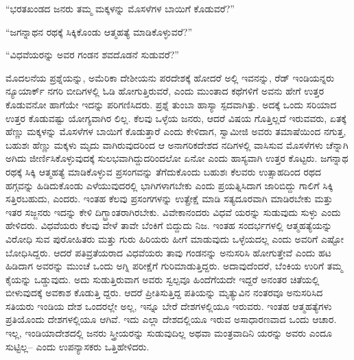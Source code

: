 \begin{myquote}
“ಭರತಖಂಡದ ಜನರು ತಮ್ಮ ಮಕ್ಕಳನ್ನು ಮೊಸಳೆಗಳ ಬಾಯಿಗೆ ಕೊಡುವರೆ?”
\end{myquote}

\begin{myquote}
“ಜಗನ್ನಾಥನ ರಥಕ್ಕೆ ಸಿಕ್ಕಿಕೊಂಡು ಆತ್ಮಹತ್ಯೆ ಮಾಡಿಕೊಳ್ಳುವರೆ?”
\end{myquote}

\begin{myquote}
“ವಿಧವೆಯರನ್ನು ಅವರ ಗಂಡನ ಶವದೊಡನೆ ಸುಡುವರೆ?”
\end{myquote}

ಮೊದಲನೆಯ ಪ್ರಶ್ನೆಯನ್ನು, ಅಮೆರಿಕಾ ದೇಶೀಯನು ಪರದೇಶಕ್ಕೆ ಹೋದರೆ ಅಲ್ಲಿ ಇವನನ್ನು, ರೆಡ್​ ಇಂಡಿಯನ್ನರು ನ್ಯೂಯಾರ್ಕ್​ ನಗರಿ ಬೀದಿಗಳಲ್ಲಿ ಓಡಿ ಹೋಗುತ್ತಿರುವರೆ, ಎಂದು ಮುಂತಾದ ಕಥೆಗಳಿಗೆ ಅವನು ಹೇಗೆ ಉತ್ತರ ಕೊಡುವನೋ ಹಾಗೆಯೇ ಇದನ್ನು ಪರಿಗಣಿಸಿದರು. ಪ್ರಶ್ನೆ ತುಂಬಾ ಹಾಸ್ಯಾ ಸ್ಪದವಾಗಿತ್ತು. ಅದಕ್ಕೆ ಒಂದು ಸರಿಯಾದ ಉತ್ತರ ಕೊಡುವಷ್ಟು ಯೋಗ್ಯವಾಗಿರ ಲಿಲ್ಲ. ಕೆಲವು ಒಳ್ಳೆಯ ಜನರು, ಆದರೆ ವಿಷಯ ಗೊತ್ತಿಲ್ಲದೆ ಇರುವವರು, ಏತಕ್ಕೆ ಹೆಣ್ಣು ಮಕ್ಕಳನ್ನು ಮೊಸಳೆಗಳ ಬಾಯಿಗೆ ಕೊಡುತ್ತಾರೆ ಎಂದು ಕೇಳಿದಾಗ, ಸ್ವಾಮೀಜಿ ಅವರು ತಮಾಷೆಯಿಂದ ನಗುತ್ತ, ಬಹುಶಃ ಹೆಣ್ಣು ಮಕ್ಕಳು ಮೃದು ವಾಗಿರುವುದರಿಂದ ಆ ಅನಾಗರಿಕದೇಶದ ನದಿಗಳಲ್ಲಿ ವಾಸಿಸುವ ಮೊಸಳೆಗಳು ಚೆನ್ನಾಗಿ ಅಗಿದು ಜೀರ್ಣಿಸಿಕೊಳ್ಳುವುದಕ್ಕೆ ಸುಲಭವಾಗಿದ್ದುದರಿಂದಲೋ ಏನೋ ಎಂದು ಹಾಸ್ಯವಾಗಿ ಉತ್ತರ ಕೊಟ್ಟರು. ಜಗನ್ನಾಥ ರಥಕ್ಕೆ ಸಿಕ್ಕಿ ಆತ್ಮಹತ್ಯೆ ಮಾಡಿಕೊಳ್ಳುವ ಪ್ರಸಂಗವನ್ನು ತೆಗೆದುಕೊಂದು ಬಹುಶಃ ಕೆಲವರು ಉತ್ಸಾಹದಿಂದ ರಥದ ಹಗ್ಗವನ್ನು ಹಿಡಿದುಕೊಂಡು ಎಳೆಯುವುದರಲ್ಲಿ ಭಾಗಿಗಳಾಗಬೇಕು ಎಂದು ಪ್ರಯತ್ನಿಸಿದಾಗ ಜಾರಿಬಿದ್ದು ಗಾಲಿಗೆ ಸಿಕ್ಕಿ ಸತ್ತಿರಬಹುದು, ಎಂದರು. ಇಂತಹ ಕೆಲವು ಪ್ರಸಂಗಗಳನ್ನು ಉತ್ಪ್ರೇಕ್ಷೆ ಮಾಡಿ ಸತ್ಯದೂರವಾಗಿ ಮಾಡಿರಬೇಕು ಮತ್ತು ಇತರ ಸಜ್ಜನರು ಇದನ್ನು ಕೇಳಿ ದಿಗ್ಭ್ರಾಂತರಾಗಿರಬೇಕು. ವಿವೇಕಾನಂದರು ವಿಧವೆ ಯರನ್ನು ಸುಡುವುದು ಸುಳ್ಳು ಎಂದು ಹೇಳಿದರು. ವಿಧವೆಯರು ಕೆಲವು ವೇಳೆ ತಾವೇ ಬೆಂಕಿಗೆ ಬಿದ್ದುದು ನಿಜ. ಇಂತಹ ಸಂದರ್ಭಗಳಲ್ಲಿ ಆತ್ಮಹತ್ಯೆಯನ್ನು ವಿರೋಧಿ ಸುವ ಪುರೋಹಿತರು ಮತ್ತು ಗುರು ಹಿರಿಯರು ಹೀಗೆ ಮಾಡುವುದು ಒಳ್ಳೆಯದಲ್ಲ ಎಂದು ಅವರಿಗೆ ಎಷ್ಟೋ ಬೋಧಿಸಿದ್ದರು. ಆದರೆ ಪತಿವ್ರತೆಯರಾದ ವಿಧವೆಯರು ತಾವು ಗಂಡನನ್ನು ಅನುಸರಿಸಿ ಹೋಗುತ್ತೇವೆ ಎಂದು ಹಟ ಹಿಡಿದಾಗ ಅವರನ್ನು ಮುಂಚೆ ಒಂದು ಅಗ್ನಿ ಪರೀಕ್ಷೆಗೆ ಗುರಿಮಾಡುತ್ತಿದ್ದರು. ಅದಾವುದೆಂದರೆ, ಬೆಂಕಿಯ ಉರಿಗೆ ತಮ್ಮ ಕೈಯನ್ನು ಒಡ್ಡುವುದು. ಅದು ಸುಡುತ್ತಿರುವಾಗ ಅವರು ಸ್ವಲ್ಪವೂ ಹಿಂದೆಗೆಯದೇ ಇದ್ದರೆ ಅನಂತರ ಚಿತೆಯಲ್ಲಿ ಬೀಳುವುದಕ್ಕೆ ಅವಕಾಶ ಕೊಡುತ್ತಿ ದ್ದರು. ಆದರೆ ಪ್ರೀತಿಸುತ್ತಿದ್ದ ಪತಿಯನ್ನು ಮೃತ್ಯುವಿನ ನಂತರವೂ ಅನುಸರಿಸಿದ ಸತಿಯರು ಇಂಡಿಯ ದೇಶ ಒಂದರಲ್ಲೇ ಅಲ್ಲ, ಇನ್ನೂ ಬೇರೆ ದೇಶಗಳಲ್ಲಿಯೂ ಇರುವರು. ಇಂತಹ ಆತ್ಮಹತ್ಯೆಗಳು ಪ್ರತಿಯೊಂದು ದೇಶಗಳಲ್ಲಿಯೂ ಆಗಿವೆ. ಇದು ಎಲ್ಲಾ ದೇಶದಲ್ಲಿಯೂ ಇರುವ ಅಸಾಧಾರಣವಾದ ಒಂದು ಆಚಾರ. ಇಲ್ಲ, ಇಂಡಿಯಾದೇಶದಲ್ಲಿ ಜನರು ಸ್ತ್ರೀಯರನ್ನು ಸುಡುವುದಿಲ್ಲ ಅಥವಾ ಮಂತ್ರವಾದಿನಿ ಯರನ್ನು ಅವರು ಎಂದೂ ಸುಟ್ಟಿಲ್ಲ– ಎಂದು ಉಪನ್ಯಾಸಕರು ಒತ್ತಿಹೇಳಿದರು.

